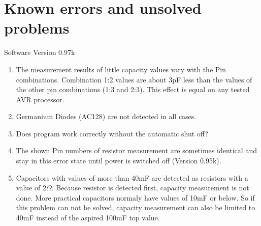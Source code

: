 
\chapter{Known errors and unsolved problems}
{\center Software Version 0.97k}

\begin{enumerate}
\item The measurement results of little capacity values vary with the Pin combinations. Combination 1:2 values are about 3pF less than the values of the other pin combinations  (1:3 and 2:3). This effect is equal on any tested AVR processor.
\item Germanium Diodes (AC128) are not detected in all cases.
\item Does program work correctly without the automatic shut off?
\item The shown Pin numbers of resistor measurement are sometimes identical and stay in this error state until power is switched off
(Version 0.95k).
\item Capacitors with values of more than 40mF are detected as resistors with a value of \(2\Omega\).
Because resistor is detected first, capacity measurement is not done. More practical capacitors normaly have
values of 10mF or below. So if this problem can not be solved, capacity measurement can also be limited to
40mF instead of the aspired 100mF top value.

\end{enumerate}
